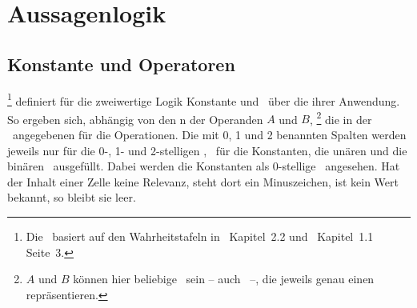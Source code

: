 \section{Aussagenlogik}%
\label{sec:Aussagenlogik}
\hidden{\Aussagenlogik}

\subsection{Konstante und Operatoren}%
\label{sub:Operatoren}
\hidden{\Operator}

%
\footnote{%
	Die \tablename\ basiert auf den Wahrheitstafeln in~\cite{bib:Junktor} Kapitel~2.2 und~\cite{bib:Rautenberg} Kapitel~1.1 Seite~3.
}
definiert für die zweiwertige Logik Konstante und \Junktoren\ über die  ihrer Anwendung.
So ergeben sich, abhängig von den n der Operanden $A$ und $B$,%
\footnote{%
	$A$ und $B$ können hier beliebige \Aussagen\ sein -- auch \Formeln\ --, die jeweils genau einen  repräsentieren.
}
die in der \tablename\ angegebenen  für die Operationen.
Die mit 0, 1 und 2 benannten Spalten werden jeweils nur für die 0-, 1- und 2-stelligen \Junktoren, \textdh\ für die Konstanten, die unären und die binären \Junktoren\ ausgefüllt.
Dabei werden die Konstanten als 0-stellige \Junktoren\ angesehen.
Hat der Inhalt einer Zelle keine Relevanz, steht dort ein Minuszeichen, ist kein Wert bekannt, so bleibt sie leer.

